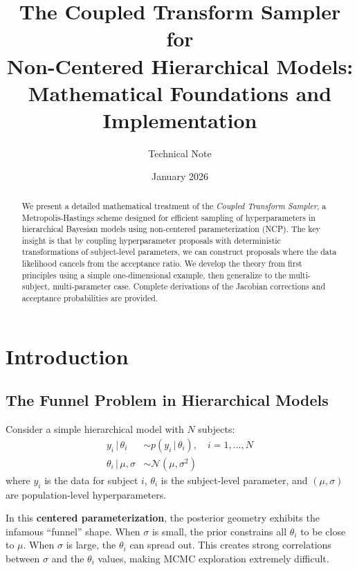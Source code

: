 \documentclass[11pt,a4paper]{article}
\title{The Coupled Transform Sampler for\\Non-Centered Hierarchical Models:\\Mathematical Foundations and Implementation}
\author{Technical Note}
\date{January 2026}
\theoremstyle{definition}
\newcommand{\Normal}{\mathcal{N}}
\newcommand{\given}{\,|\,}
\begin{document}
\maketitle

\begin{abstract}
We present a detailed mathematical treatment of the \emph{Coupled Transform Sampler},
a Metropolis-Hastings scheme designed for efficient sampling of hyperparameters in
hierarchical Bayesian models using non-centered parameterization (NCP). The key insight
is that by coupling hyperparameter proposals with deterministic transformations of
subject-level parameters, we can construct proposals where the data likelihood cancels
from the acceptance ratio. We develop the theory from first principles using a simple
one-dimensional example, then generalize to the multi-subject, multi-parameter case.
Complete derivations of the Jacobian corrections and acceptance probabilities are provided.
\end{abstract}

\tableofcontents
\newpage

\section{Introduction}

\subsection{The Funnel Problem in Hierarchical Models}

Consider a simple hierarchical model with $N$ subjects:
\begin{align}
    y_i \given \theta_i &\sim p(y_i \given \theta_i), \quad i = 1, \ldots, N \\
    \theta_i \given \mu, \sigma &\sim \Normal(\mu, \sigma^2)
\end{align}
where $y_i$ is the data for subject $i$, $\theta_i$ is the subject-level parameter,
and $(\mu, \sigma)$ are population-level hyperparameters.

In this \textbf{centered parameterization}, the posterior geometry exhibits the
infamous ``funnel'' shape. When $\sigma$ is small, the prior constrains all $\theta_i$
to be close to $\mu$. When $\sigma$ is large, the $\theta_i$ can spread out. This
creates strong correlations between $\sigma$ and the $\theta_i$ values, making MCMC
exploration extremely difficult.
\end{document}
